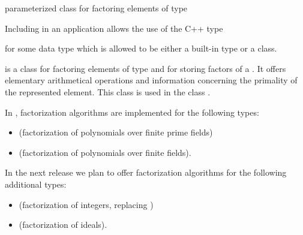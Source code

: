 %
%
%
%
%

\newcommand{\base}{\mathit{base}}
\newcommand{\state}{\mathit{state}}



\NAME

 \dotfill parameterized class for factoring elements of
type 



\ABSTRACT

Including  in an application allows the use of the C++ type
\begin{quote}
\end{quote}
for some data type  which is allowed to be either a built-in type or a class.

 is a class for factoring elements of type  and for storing
factors of a .  It offers elementary arithmetical operations and
information concerning the primality of the represented element.  This class is used in the
class .

In \LiDIA, factorization algorithms are implemented for the following types:
\begin{itemize}
\item {} (factorization of polynomials over finite prime
  fields)
\item {} (factorization of polynomials over
  finite fields).
\end{itemize}
In the next release we plan to offer factorization algorithms for the following additional
types:
\begin{itemize}
\item {} (factorization of integers, replacing
  )
\item {} (factorization of ideals).
\end{itemize}


